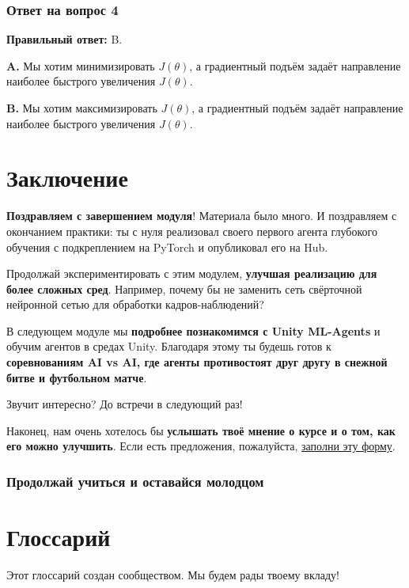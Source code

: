 \documentclass[11pt,a4paper]{article}
\begin{document}
\subsubsection{Ответ на вопрос 4}\label{q4-solution}

\textbf{Правильный ответ:} B.

\textbf{A.} Мы хотим минимизировать \(J(\theta)\), а градиентный подъём задаёт направление наиболее быстрого увеличения \(J(\theta)\).

\textbf{B.} Мы хотим максимизировать \(J(\theta)\), а градиентный подъём задаёт направление наиболее быстрого увеличения \(J(\theta)\).

\section{Заключение}\label{conclusion}

\textbf{Поздравляем с завершением модуля}! Материала было много. И поздравляем с окончанием практики: ты с нуля реализовал своего первого агента глубокого обучения с подкреплением на PyTorch и опубликовал его на Hub.

Продолжай экспериментировать с этим модулем, \textbf{улучшая реализацию для более сложных сред}. Например, почему бы не заменить сеть свёрточной нейронной сетью для обработки кадров-наблюдений?

В следующем модуле мы \textbf{подробнее познакомимся с Unity ML-Agents} и обучим агентов в средах Unity. Благодаря этому ты будешь готов к \textbf{соревнованиям AI vs AI, где агенты противостоят друг другу в снежной битве и футбольном матче}.

Звучит интересно? До встречи в следующий раз!

Наконец, нам очень хотелось бы \textbf{услышать твоё мнение о курсе и о том, как его можно улучшить}. Если есть предложения, пожалуйста, \href{https://forms.gle/BzKXWzLAGZESGNaE9}{заполни эту форму}.

\subsubsection{Продолжай учиться и оставайся молодцом}\label{keep-learning-stay-awesome-1}

\begingroup\small
\section{Глоссарий}\label{glossary}

Этот глоссарий создан сообществом. Мы будем рады твоему вкладу!
\end{document}
